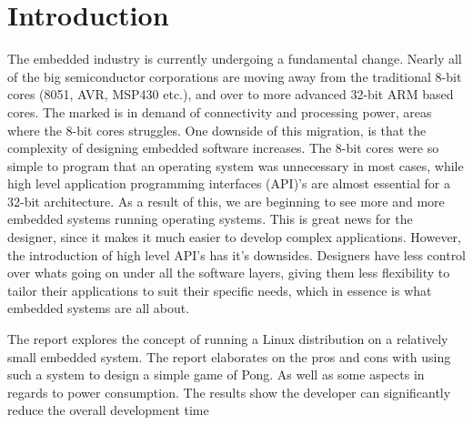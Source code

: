\chapter{Introduction}

The embedded industry is currently undergoing a fundamental change. Nearly all of the big semiconductor corporations are moving away from the traditional 8-bit cores (8051, AVR, MSP430 etc.), and over to more advanced 32-bit ARM based cores. The marked is in demand of connectivity and processing power, areas where the 8-bit cores struggles. One downside of this migration, is that the complexity of designing embedded software increases. The 8-bit cores were so simple to program that an operating system was unnecessary in most cases, while high level application programming interfaces (API)'s are almost essential for a 32-bit architecture. As a result of this, we are beginning to see more and more embedded systems running operating systems. This is great news for the designer, since it makes it much easier to develop complex applications. However, the introduction of high level API's has it's downsides. Designers have less control over whats going on under all the software layers, giving them less flexibility to tailor their applications to suit their specific needs, which in essence is what embedded systems are all about.

The report explores the concept of running a Linux distribution on a relatively small embedded system. The report elaborates on the pros and cons with using such a system to design a simple game of Pong. As well as some aspects in regards to power consumption. The results show the developer can significantly reduce the overall development time 


